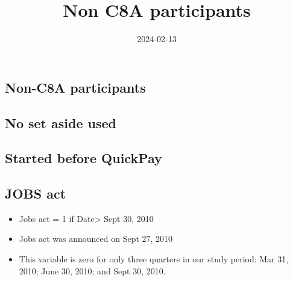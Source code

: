 \documentclass[
]{article}
\title{Non C8A participants}
\author{}
\date{\vspace{-2.5em}2024-02-13}
\providecommand{\tightlist}{%
  \setlength{\itemsep}{0pt}\setlength{\parskip}{0pt}}
\begin{document}
\maketitle

\hypertarget{non-c8a-participants}{%
\subsection{Non-C8A participants}\label{non-c8a-participants}}

\hypertarget{no-set-aside-used}{%
\subsection{No set aside used}\label{no-set-aside-used}}

\hypertarget{started-before-quickpay}{%
\subsection{Started before QuickPay}\label{started-before-quickpay}}

\hypertarget{jobs-act}{%
\subsection{JOBS act}\label{jobs-act}}

\begin{itemize}
\tightlist
\item
  Jobs act = 1 if Date\textgreater{} Sept 30, 2010
\item
  Jobs act was announced on Sept 27, 2010
\item
  This variable is zero for only three quarters in our study period: Mar
  31, 2010; June 30, 2010; and Sept 30, 2010.
\end{itemize}
\end{document}
